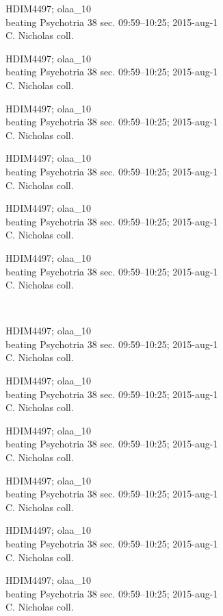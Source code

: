\documentclass[2pt]{extarticle}
\begin{document}
\noindent
\parbox{0.16\textwidth}{\tiny \raggedright \rule[-0.3\baselineskip]{0pt}{10pt}HDIM4497; olaa\_10\\ beating Psychotria 38 sec. 09:59--10:25; 2015-aug-1\\ C. Nicholas coll.}
\parbox{0.16\textwidth}{\tiny \raggedright \rule[-0.3\baselineskip]{0pt}{10pt}HDIM4497; olaa\_10\\ beating Psychotria 38 sec. 09:59--10:25; 2015-aug-1\\ C. Nicholas coll.}
\parbox{0.16\textwidth}{\tiny \raggedright \rule[-0.3\baselineskip]{0pt}{10pt}HDIM4497; olaa\_10\\ beating Psychotria 38 sec. 09:59--10:25; 2015-aug-1\\ C. Nicholas coll.}
\parbox{0.16\textwidth}{\tiny \raggedright \rule[-0.3\baselineskip]{0pt}{10pt}HDIM4497; olaa\_10\\ beating Psychotria 38 sec. 09:59--10:25; 2015-aug-1\\ C. Nicholas coll.}
\parbox{0.16\textwidth}{\tiny \raggedright \rule[-0.3\baselineskip]{0pt}{10pt}HDIM4497; olaa\_10\\ beating Psychotria 38 sec. 09:59--10:25; 2015-aug-1\\ C. Nicholas coll.}
\parbox{0.16\textwidth}{\tiny \raggedright \rule[-0.3\baselineskip]{0pt}{10pt}HDIM4497; olaa\_10\\ beating Psychotria 38 sec. 09:59--10:25; 2015-aug-1\\ C. Nicholas coll.} \\ 
\vspace{0.001in} 

\noindent
\parbox{0.16\textwidth}{\tiny \raggedright \rule[-0.3\baselineskip]{0pt}{10pt}HDIM4497; olaa\_10\\ beating Psychotria 38 sec. 09:59--10:25; 2015-aug-1\\ C. Nicholas coll.}
\parbox{0.16\textwidth}{\tiny \raggedright \rule[-0.3\baselineskip]{0pt}{10pt}HDIM4497; olaa\_10\\ beating Psychotria 38 sec. 09:59--10:25; 2015-aug-1\\ C. Nicholas coll.}
\parbox{0.16\textwidth}{\tiny \raggedright \rule[-0.3\baselineskip]{0pt}{10pt}HDIM4497; olaa\_10\\ beating Psychotria 38 sec. 09:59--10:25; 2015-aug-1\\ C. Nicholas coll.}
\parbox{0.16\textwidth}{\tiny \raggedright \rule[-0.3\baselineskip]{0pt}{10pt}HDIM4497; olaa\_10\\ beating Psychotria 38 sec. 09:59--10:25; 2015-aug-1\\ C. Nicholas coll.}
\parbox{0.16\textwidth}{\tiny \raggedright \rule[-0.3\baselineskip]{0pt}{10pt}HDIM4497; olaa\_10\\ beating Psychotria 38 sec. 09:59--10:25; 2015-aug-1\\ C. Nicholas coll.}
\parbox{0.16\textwidth}{\tiny \raggedright \rule[-0.3\baselineskip]{0pt}{10pt}HDIM4497; olaa\_10\\ beating Psychotria 38 sec. 09:59--10:25; 2015-aug-1\\ C. Nicholas coll.} \\ 
\vspace{0.001in} 
\end{document}
